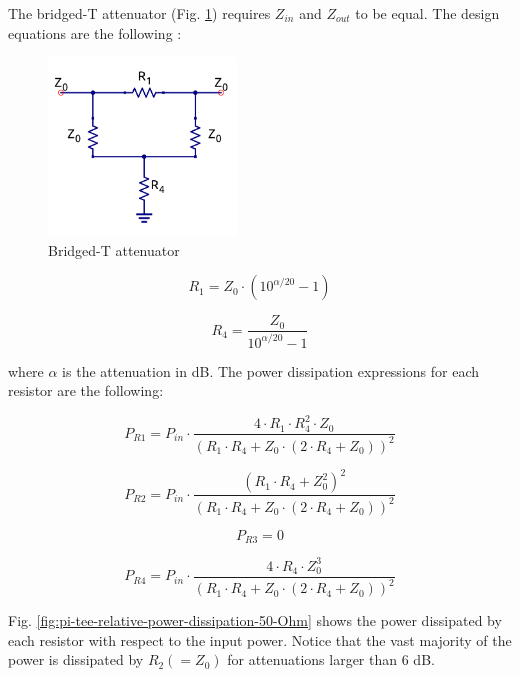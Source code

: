 \noindent The bridged-T attenuator (Fig. \ref{fig:bridged-tee-attenuator-schematic}) requires $Z_{in}$ and $Z_{out}$ to be equal. The design equations are the following \cite{vizmuller1995rf}:

  \begin{figure}[ht]
    \centering
    \includegraphics[width=5cm]{./images/bridged-tee-attenuator-schematic.png}
    \caption{Bridged-T attenuator}
    \label{fig:bridged-tee-attenuator-schematic}
  \end{figure}

\begin{equation}
	R_1 = Z_0 \cdot (10^{\alpha/20} - 1)
\end{equation}

\begin{equation}
	R_4 = \frac{Z_0}{10^{\alpha/20} - 1}
\end{equation}
  
\noindent where $\alpha$ is the attenuation in dB. The power dissipation expressions for each resistor are the following:

\begin{equation}
	P_{R1} = P_{in} \cdot \frac{4 \cdot R_1 \cdot R_4^2 \cdot Z_0}{(R_1 \cdot R_4 + Z_0 \cdot (2 \cdot R_4 + Z_0))^2}
\end{equation}

\begin{equation}
	P_{R2} = P_{in} \cdot \frac{(R_1 \cdot R_4 + Z_0^2)^2}{(R_1 \cdot R_4 + Z_0 \cdot (2 \cdot R_4 + Z_0))^2}
\end{equation}

\begin{equation}
	P_{R3} = 0
\end{equation}

\begin{equation}
	P_{R4} = P_{in} \cdot  \frac{4 \cdot R_4 \cdot Z_0^3}{(R_1 \cdot R_4 + Z_0 \cdot (2 \cdot R_4 + Z_0))^2}
\end{equation}

\noindent Fig. \ref{fig:pi-tee-relative-power-dissipation-50-Ohm} shows the power dissipated by each resistor with respect to the input power. Notice that the vast majority of the power is dissipated by $R_2 (= Z_0)$ for attenuations larger than 6 dB.


